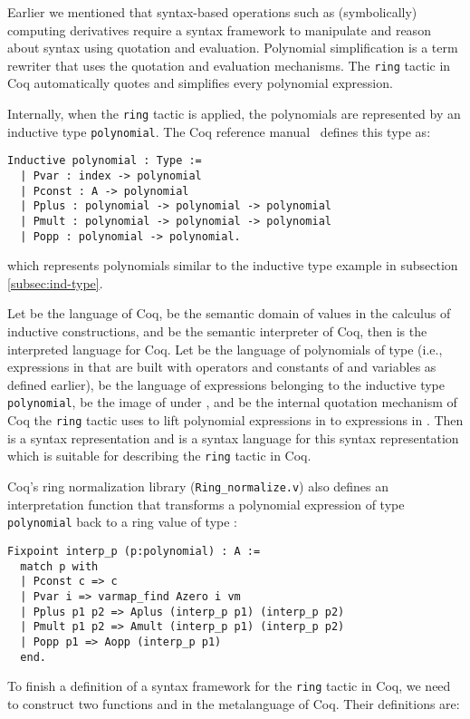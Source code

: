 \documentclass[11pt,fleqn]{article}
\begin{document}
Earlier we mentioned that syntax-based operations such as
(symbolically) computing derivatives require a syntax framework to
manipulate and reason about syntax using quotation and evaluation.
Polynomial simplification is a term rewriter that uses the quotation
and evaluation mechanisms.  The {\tt ring} tactic in Coq automatically
quotes and simplifies every polynomial expression.

Internally, when the {\tt ring} tactic is applied, the polynomials are
represented by an inductive type {\tt polynomial}. The Coq
reference manual~\cite{Coq8.4} defines this type as:
\begin{verbatim}
Inductive polynomial : Type :=
  | Pvar : index -> polynomial
  | Pconst : A -> polynomial
  | Pplus : polynomial -> polynomial -> polynomial
  | Pmult : polynomial -> polynomial -> polynomial
  | Popp : polynomial -> polynomial.
\end{verbatim}
which represents polynomials similar to the inductive type example in
subsection \ref{subsec:ind-type}.

Let  be the language of Coq,  be the semantic domain of values
in the calculus of inductive constructions, and  be the semantic
interpreter of Coq, then  is the interpreted language for
Coq. Let  be the language of polynomials of type 
(i.e., expressions in  that are built with operators and constants
of  and variables  as defined earlier),  be the language of expressions belonging to the
inductive type {\tt polynomial},  be the
image of  under , and  be the internal
quotation mechanism of Coq the {\tt ring} tactic uses to lift
polynomial expressions in  to expressions in .
Then  is a syntax representation and
 is a syntax language for this syntax representation
which is suitable for describing the \texttt{ring} tactic in Coq.

Coq's ring normalization library ({\tt Ring\_normalize.v}) also defines
an interpretation function that transforms a polynomial expression of
type {\tt polynomial} back to a ring value of type :
\begin{verbatim}
Fixpoint interp_p (p:polynomial) : A :=
  match p with
  | Pconst c => c
  | Pvar i => varmap_find Azero i vm
  | Pplus p1 p2 => Aplus (interp_p p1) (interp_p p2)
  | Pmult p1 p2 => Amult (interp_p p1) (interp_p p2)
  | Popp p1 => Aopp (interp_p p1)
  end.
\end{verbatim}

To finish a definition of a syntax framework for the \texttt{ring}
tactic in Coq, we need to construct two functions  and  in the metalanguage of Coq.
Their definitions are:
\end{document}
